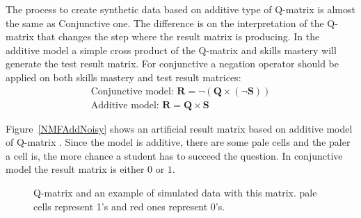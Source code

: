The process to create synthetic data based on additive type of Q-matrix is almost the same as Conjunctive one. The difference is on the interpretation of the Q-matrix that changes the step where the result matrix is producing. In the additive model a simple cross product of the Q-matrix and skills mastery will generate the test result matrix. For conjunctive a negation operator should be applied on both skills mastery and test result matrices: 
\begin{equation}
\begin{array}{c}
\text{Conjunctive model:   } \mathbf{R}=\neg\left(\mathbf{Q}\times\left(\neg\mathbf{S}\right)\right)\\
\text{Additive model:   } \mathbf{R}=\mathbf{Q}\times\mathbf{S}
\end{array}
\label{NMF_GEN_EQ}
\end{equation}

Figure~\ref{NMFAddNoisy} shows an artificial result matrix based on additive model of Q-matrix . Since the model is additive, there are some pale cells and the paler a cell is, the more chance a student has to succeed the question. In conjunctive model the result matrix is either $0$ or $1$. 



\begin{figure}[ht]
\centering

\quad
\caption{Q-matrix and an example of simulated data with this matrix.  pale cells represent 1's and red ones represent 0's.}
\label{figqmatrixandResutM}
\end{figure}


